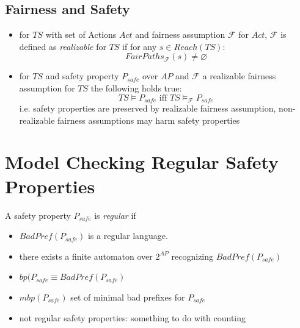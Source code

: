 \documentclass[a4paper, 10pt]{article}
\begin{document}
\subsection*{Fairness and Safety}
\begin{itemize}
    \item for $TS$ with set of Actions $Act$ and fairness assumption $\mathcal{F}$ for $Act$, $\mathcal{F}$ is defined as \emph{realizable} for $TS$ if for any $s\in Reach(TS):$ \[ FairPaths_\mathcal{F}(s)\not=\varnothing \]
    \item for $TS$ and safety property $P_{safe}$ over $AP$ and $\mathcal{F}$ a realizable fairness assumption for $TS$ the following holds true: \[ TS\models P_{safe} \textrm{ iff } TS\models_\mathcal{F}P_{safe} \] {\tiny i.e. safety properties are preserved by realizable fairness assumption, non-realizable fairness assumptions may harm safety properties}
\end{itemize}

\section*{Model Checking Regular Safety Properties}
\begin{shaded}
A safety property $P_{safe}$ is \emph{regular} if
\begin{itemize}
    \item $BadPref(P_{safe})$ is a regular language.
    \item there exists a finite automaton over $2^{AP}$ recognizing $BadPref(P_{safe})$
\end{itemize}
\end{shaded}
\begin{itemize}
    \item $bp(P_{safe} \equiv BadPref(P_{safe})$
    \item $mbp(P_{safe})$ \follows set of minimal bad prefixes for $P_{safe}$
    \item not regular safety properties: something to do with counting
\end{itemize}
\end{document}
